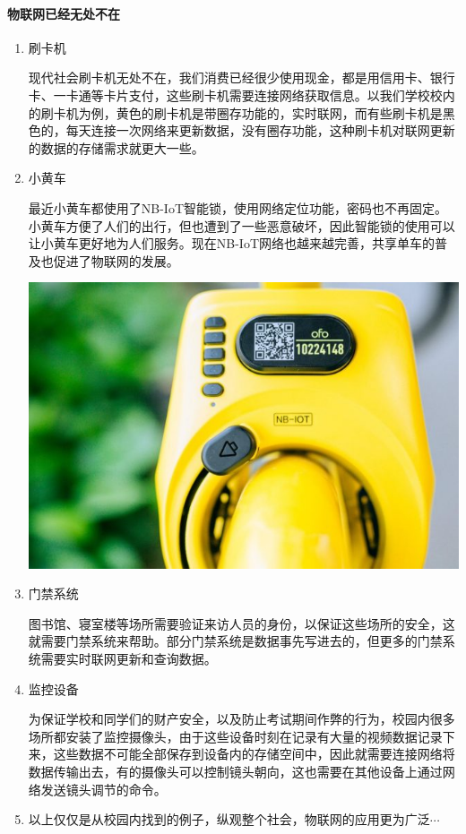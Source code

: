 \documentclass{ctexart}
\begin{document}
\paragraph{物联网已经无处不在}
\begin{enumerate}
	\item 刷卡机

	现代社会刷卡机无处不在，我们消费已经很少使用现金，都是用信用卡、银行卡、一卡通等卡片支付，这些刷卡机需要连接网络获取信息。以我们学校校内的刷卡机为例，黄色的刷卡机是带圈存功能的，实时联网，而有些刷卡机是黑色的，每天连接一次网络来更新数据，没有圈存功能，这种刷卡机对联网更新的数据的存储需求就更大一些。
	\item 小黄车

	最近小黄车都使用了NB-IoT智能锁，使用网络定位功能，密码也不再固定。小黄车方便了人们的出行，但也遭到了一些恶意破坏，因此智能锁的使用可以让小黄车更好地为人们服务。现在NB-IoT网络也越来越完善，共享单车的普及也促进了物联网的发展。

	\includegraphics[width=\textwidth]{NB-IoT.jpg}
	\item 门禁系统

	图书馆、寝室楼等场所需要验证来访人员的身份，以保证这些场所的安全，这就需要门禁系统来帮助。部分门禁系统是数据事先写进去的，但更多的门禁系统需要实时联网更新和查询数据。
	\item 监控设备

	为保证学校和同学们的财产安全，以及防止考试期间作弊的行为，校园内很多场所都安装了监控摄像头，由于这些设备时刻在记录有大量的视频数据记录下来，这些数据不可能全部保存到设备内的存储空间中，因此就需要连接网络将数据传输出去，有的摄像头可以控制镜头朝向，这也需要在其他设备上通过网络发送镜头调节的命令。
	\item 以上仅仅是从校园内找到的例子，纵观整个社会，物联网的应用更为广泛$\cdots$
\end{enumerate}
\end{document}
